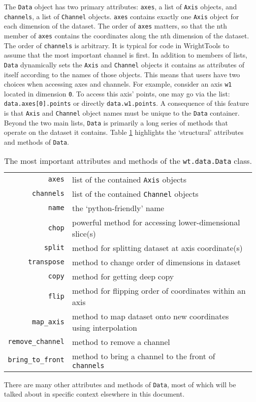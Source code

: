 \documentclass[11pt]{article}
\begin{document}
The \texttt{Data} object has two primary attributes: \texttt{axes}, a list of \texttt{Axis} objects, and \texttt{channels}, a list of \texttt{Channel} objects. \texttt{axes} contains exactly one \texttt{Axis} object for each dimension of the dataset. The order of \texttt{axes} matters, so that the nth member of \texttt{axes} contains the coordinates along the nth dimension of the dataset. The order of \texttt{channels} is arbitrary. It is typical for code in WrightTools to assume that the most important channel is first. In addition to members of lists, \texttt{Data} dynamically sets the \texttt{Axis} and \texttt{Channel} objects it contains as attributes of itself according to the names of those objects. This means that users have two choices when accessing axes and channels. For example, consider an axis \texttt{w1} located in dimension \texttt{0}. To access this axis' points, one may go via the list: \texttt{data.axes[0].points} or directly \texttt{data.w1.points}. A consequence of this feature is that \texttt{Axis} and \texttt{Channel} object names must be unique to the \texttt{Data} container. Beyond the two main lists, \texttt{Data} is primarily a long series of methods that operate on the dataset it contains. Table \ref{tab:data properties} highlights the `structural' attributes and methods of \texttt{Data}.
\begin{table}\label{tab:data properties}
	\begin{center}
		\begin{tabular}{r | l}
			\texttt{axes} & list of the contained \texttt{Axis} objects \\ 
			\texttt{channels} & list of the contained \texttt{Channel} objects \\
			\texttt{name} & the `python-friendly' name \\
			\texttt{chop} & powerful method for accessing lower-dimensional slice(s) \\
			\texttt{split} & method for splitting dataset at axis coordinate(s) \\
			\texttt{transpose} & method to change order of dimensions in dataset \\
			\texttt{copy} & method for getting deep copy \\
			\texttt{flip} & method for flipping order of coordinates within an axis \\
			\texttt{map\_axis} & method to map dataset onto new coordinates using interpolation \\
			\texttt{remove\_channel} & method to remove a channel \\
			\texttt{bring\_to\_front} & method to bring a channel to the front of \texttt{channels} \\
		\end{tabular}
	\end{center}
	\caption{The most important attributes and methods of the \texttt{wt.data.Data} class.}
\end{table}
There are many other attributes and methods of \texttt{Data}, most of which will be talked about in specific context elsewhere in this document.
\end{document}
